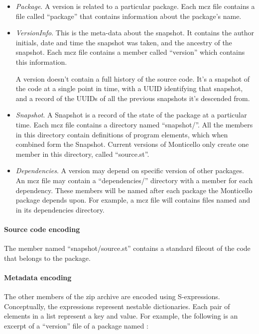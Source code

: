 \documentclass[a4paper,10pt,twoside]{book}
\begin{document}
\begin{itemize}
\item \emph{Package}. A version is related to a particular package. Each mcz file contains a file called ``package'' that contains information about the package's name.

\item \emph{VersionInfo}. This is the meta-data about the snapshot. It contains the author initials, date and time the snapshot was taken, and the ancestry of the snapshot. Each mcz file contains a member called ``version'' which contains this information.

A version doesn't contain a full history of the source code. It's a snapshot of the code at a single point in time, with a UUID identifying that snapshot, and a record of the UUIDs of all the previous snapshots it's descended from.

\item \emph{Snapshot}. A Snapshot is a record of the state of the package at a particular time. Each mcz file contains a directory named ``snapshot/''. All the members in this directory contain definitions of program elements, which when combined form the Snapshot. Current versions of Monticello only create one member in this directory, called ``source.st''.
\item \emph{Dependencies}. A version may depend on specific version of other packages. An mcz file may contain a ``dependencies/'' directory with a member for each dependency. These members will be named after each package the Monticello package depends upon. For example, a  mcz file will contains files named  and  in its dependencies directory.
\end{itemize}

\paragraph{Source code encoding}

The member named ``snapshot/source.st'' contains a standard fileout of the code that belongs to the package.

\paragraph{Metadata encoding}

The other members of the zip archive are encoded using S-expressions. Conceptually, the expressions represent nestable dictionaries. Each pair of elements in a list represent a key and value. For example, the following is an excerpt of a ``version'' file of a package named :
\end{document}
